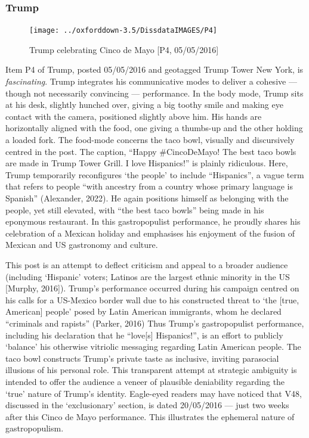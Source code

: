 \documentclass[a4paper, nobind]{templates/ociamthesis}
\begin{document}
\hypertarget{trump-2}{%
\subsubsection*{Trump}\label{trump-2}}

\begin{figure}
\texttt{[image: ../oxforddown-3.5/DissdataIMAGES/P4]} \caption{Trump celebrating Cinco de Mayo [P4, 05/05/2016]}\label{fig:unnamed-chunk-20}
\end{figure}

Item P4 of Trump, posted 05/05/2016 and geotagged Trump Tower New York, is \emph{fascinating}.
Trump integrates his communicative modes to deliver a cohesive --- though not necessarily convincing --- performance.
In the body mode, Trump sits at his desk, slightly hunched over, giving a big toothy smile and making eye contact with the camera, positioned slightly above him.
His hands are horizontally aligned with the food, one giving a thumbs-up and the other holding a loaded fork.
The food-mode concerns the taco bowl, visually and discursively centred in the post.
The caption, ``Happy \#CincoDeMayo! The best taco bowls are made in Trump Tower Grill. I love Hispanics!'' is plainly ridiculous.
Here, Trump temporarily reconfigures `the people' to include ``Hispanics'', a vague term that refers to people ``with ancestry from a country whose primary language is Spanish'' (Alexander, 2022).
He again positions himself as belonging with the people, yet still elevated, with ``the best taco bowls'' being made in his eponymous restaurant.
In this gastropopulist performance, he proudly shares his celebration of a Mexican holiday and emphasises his enjoyment of the fusion of Mexican and US gastronomy and culture.

This post is an attempt to deflect criticism and appeal to a broader audience (including `Hispanic' voters; Latinos are the largest ethnic minority in the US {[}Murphy, 2016{]}).
Trump's performance occurred during his campaign centred on his calls for a US-Mexico border wall due to his constructed threat to `the {[}true, American{]} people' posed by Latin American immigrants, whom he declared ``criminals and rapists'' (Parker, 2016)
Thus Trump's gastropopulist performance, including his declaration that he ``love{[}s{]} Hispanics!'', is an effort to publicly `balance' his otherwise vitriolic messaging regarding Latin American people.
The taco bowl constructs Trump's private taste as inclusive, inviting parasocial illusions of his personal role.
This transparent attempt at strategic ambiguity is intended to offer the audience a veneer of plausible deniability regarding the `true' nature of Trump's identity.
Eagle-eyed readers may have noticed that V48, discussed in the `exclusionary' section, is dated 20/05/2016 --- just two weeks after this Cinco de Mayo performance.
This illustrates the ephemeral nature of gastropopulism.
\end{document}
